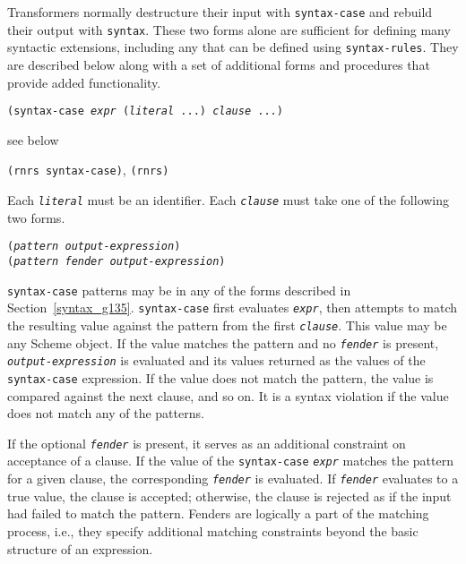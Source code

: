 Transformers normally destructure their input with \texttt{syntax-case} and rebuild
their output with \texttt{syntax}.
These two forms alone are sufficient for defining many syntactic extensions,
including any that can be defined using \texttt{syntax-rules}.
They are described below along with a set of additional forms and
procedures that provide added functionality.

\begin{description}

\label{syntax_s30}\item[syntax] \texttt{(syntax-case \textit{expr} (\textit{literal} ...) \textit{clause} ...)}



\item[returns] see below


\item[libraries] \texttt{(rnrs syntax-case)}, \texttt{(rnrs)}
\end{description}


Each \texttt{\textit{literal}} must be an identifier.
Each \texttt{\textit{clause}} must take one of the following two forms.


\begin{alltt}
(\textit{pattern} \textit{output-expression})
(\textit{pattern} \textit{fender} \textit{output-expression})
\end{alltt}

\texttt{syntax-case} patterns may be in any of the forms described
in Section \ref{syntax_g135}.
\texttt{syntax-case} first evaluates \texttt{\textit{expr}}, then attempts
to match the resulting value against the pattern from the first
\texttt{\textit{clause}}.
This value may be any Scheme object.
If the value matches the pattern and no
\label{syntax_s31}\texttt{\textit{fender}} is present,
\texttt{\textit{output-expression}} is evaluated and its values returned as the
values of the \texttt{syntax-case} expression.
If the value does not match the pattern, the value is compared against
the next clause, and so on.
It is a syntax violation if the value does not match any of the patterns.

If the optional \texttt{\textit{fender}} is present, it serves as an additional
constraint on acceptance of a clause.
If the value of the \texttt{syntax-case} \texttt{\textit{expr}} matches the pattern for a given
clause, the corresponding \texttt{\textit{fender}} is evaluated.
If \texttt{\textit{fender}} evaluates to a true value, the clause is accepted;
otherwise, the clause is rejected as if the input had failed to match
the pattern.
Fenders are logically a part of the matching process, i.e., they
specify additional matching constraints beyond the basic structure of
an expression.


